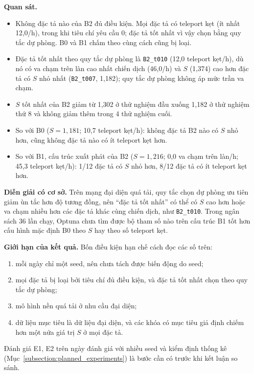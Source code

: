 \documentclass[../DoAn.tex]{subfiles}
\begin{document}
\textbf{Quan sát.}
\begin{itemize}
\item Không đặc tả nào của B2 đủ điều kiện. Mọi đặc tả có teleport kẹt (ít nhất 12,0/h), trong khi tiêu chí yêu cầu 0; đặc tả tốt nhất vì vậy chọn bằng quy tắc dự phòng. B0 và B1 chấm theo cùng cách cũng bị loại.
\item Đặc tả tốt nhất theo quy tắc dự phòng là \texttt{B2\_t010} (12,0 teleport kẹt/h), dù nó có va chạm trên làn cao nhất chiến dịch (46,0/h) và $S$ (1,374) cao hơn đặc tả có $S$ nhỏ nhất (\texttt{B2\_t007}, 1,182); quy tắc dự phòng không áp mức trần va chạm.
\item $S$ tốt nhất của B2 giảm từ 1,302 ở thử nghiệm đầu xuống 1,182 ở thử nghiệm thứ 8 và không giảm thêm trong 4 thử nghiệm cuối.
\item So với B0 ($S = 1{,}181$; 10,7 teleport kẹt/h): không đặc tả B2 nào có $S$ nhỏ hơn, cũng không đặc tả nào có ít teleport kẹt hơn.
\item So với B1, cấu trúc xuất phát của B2 ($S = 1{,}216$; 0,0 va chạm trên làn/h; 45,3 teleport kẹt/h): 1/12 đặc tả có $S$ nhỏ hơn, 8/12 đặc tả có ít teleport kẹt hơn.
\end{itemize}

\textbf{Diễn giải có cơ sở.} Trên mạng đại diện quá tải, quy tắc chọn dự phòng ưu tiên giảm ùn tắc hơn độ tương đồng, nên ``đặc tả tốt nhất'' có thể có $S$ cao hơn hoặc va chạm nhiều hơn các đặc tả khác cùng chiến dịch, như \texttt{B2\_t010}. Trong ngân sách 36 lần chạy, Optuna chưa tìm được bộ tham số nào trên cấu trúc B1 tốt hơn cấu hình mặc định B0 theo $S$ hay theo số teleport kẹt.

\textbf{Giới hạn của kết quả.} Bốn điều kiện hạn chế cách đọc các số trên:
\begin{enumerate}[label=(\roman*)]
    \item mỗi ngày chỉ một seed, nên chưa tách được biến động do seed;
    \item mọi đặc tả bị loại bởi tiêu chí đủ điều kiện, và đặc tả tốt nhất chọn theo quy tắc dự phòng;
    \item mô hình nền quá tải ở nhu cầu đại diện;
    \item dữ liệu mục tiêu là dữ liệu đại diện, và các khóa có mục tiêu giả định chiếm hơn một nửa giá trị $S$ ở mọi đặc tả.
\end{enumerate}
Đánh giá E1, E2 trên ngày đánh giá với nhiều seed và kiểm định thống kê (Mục~\ref{subsection:planned_experiments}) là bước cần có trước khi kết luận so sánh.
\end{document}
